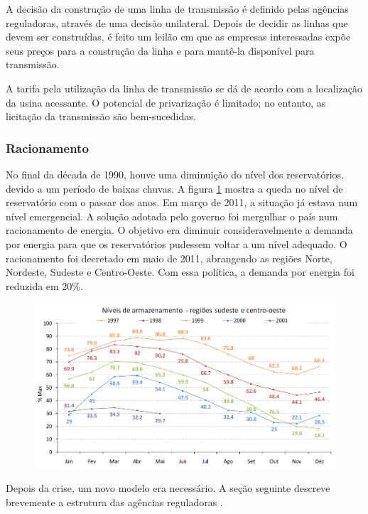A decisão da construção de uma linha de transmissão é definido pelas
agências reguladoras, através de uma decisão unilateral. Depois de
decidir as linhas que devem ser construídas, é feito um leilão em
que as empresas interessadas expõe seus preços para a construção da
linha e para mantê-la disponível para transmissão. 

A tarifa pela utilização da linha de transmissão se dá de acordo com
a localização da usina acessante. O potencial de privarização é limitado;
no entanto, as licitação da transmissão são bem-sucedidas.


\subsubsection*{Racionamento}

No final da década de 1990, houve uma diminuição do nível dos reservatórios,
devido a um período de baixas chuvas. A figura \ref{fig:nivel-reserv}
mostra a queda no nível de reservatório com o passar dos anos. Em
março de 2011, a situação já estava num nível emergencial. A solução
adotada pelo governo foi mergulhar o país num racionamento de energia.
O objetivo era diminuir consideravelmente a demanda por energia para
que os reservatórios pudessem voltar a um nível adequado. O racionamento
foi decretado em maio de 2011, abrangendo as regiões Norte, Nordeste,
Sudeste e Centro-Oeste. Com essa política, a demanda por energia foi
reduzida em 20\%.

\begin{figure}
\includegraphics[scale=0.5]{anexos/aula110-2}

\protect\caption{\label{fig:nivel-reserv}}
\end{figure}


Depois da crise, um novo modelo era necessário. A seção seguinte descreve
brevemente a estrutura das agências reguladoras .


